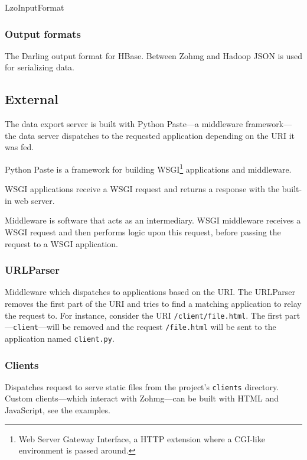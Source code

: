 LzoInputFormat


\subsubsection{Output formats}

The Darling output format for HBase. Between Zohmg and Hadoop JSON is used
for serializing data.


\subsection{External}

The data export server is built with Python Paste---a middleware
framework---the data server dispatches to the requested application
depending on the URI it was fed.

Python Paste is a framework for building WSGI\footnote{Web Server Gateway
Interface, a HTTP extension where a CGI-like environment is passed around.}
applications and middleware. \cite{definitive_guide_to_pylons}

WSGI applications receive a WSGI request and returns a response with the
built-in web server.

Middleware is software that acts as an intermediary. WSGI middleware
receives a WSGI request and then performs logic upon this request, before
passing the request to a WSGI application. \cite{paste}


\subsubsection{URLParser}

Middleware which dispatches to applications based on the URI. The URLParser
removes the first part of the URI and tries to find a matching application
to relay the request to. For instance, consider the URI
\texttt{/client/file.html}. The first part---\texttt{client}---will be
removed and the request \texttt{/file.html} will be sent to the application
named \texttt{client.py}.


\subsubsection{Clients}

Dispatches request to serve static files from the project's
\texttt{clients} directory. Custom clients---which interact with Zohmg---can
be built with HTML and JavaScript, see the examples.


